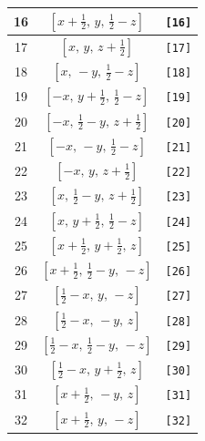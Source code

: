 \documentclass[fleqn,8pt]{jsarticle}
\begin{document}
\begin{longtable}{ccc}
16 & $\left[ x + \frac{1}{2},\, y,\, \frac{1}{2} - z \right]$ & {\tt [16]} \\ \hline
17 & $\left[ x,\, y,\, z + \frac{1}{2} \right]$ & {\tt [17]} \\ \hline
18 & $\left[ x,\, - y,\, \frac{1}{2} - z \right]$ & {\tt [18]} \\ \hline
19 & $\left[ - x,\, y + \frac{1}{2},\, \frac{1}{2} - z \right]$ & {\tt [19]} \\ \hline
20 & $\left[ - x,\, \frac{1}{2} - y,\, z + \frac{1}{2} \right]$ & {\tt [20]} \\ \hline
21 & $\left[ - x,\, - y,\, \frac{1}{2} - z \right]$ & {\tt [21]} \\ \hline
22 & $\left[ - x,\, y,\, z + \frac{1}{2} \right]$ & {\tt [22]} \\ \hline
23 & $\left[ x,\, \frac{1}{2} - y,\, z + \frac{1}{2} \right]$ & {\tt [23]} \\ \hline
24 & $\left[ x,\, y + \frac{1}{2},\, \frac{1}{2} - z \right]$ & {\tt [24]} \\ \hline
25 & $\left[ x + \frac{1}{2},\, y + \frac{1}{2},\, z \right]$ & {\tt [25]} \\ \hline
26 & $\left[ x + \frac{1}{2},\, \frac{1}{2} - y,\, - z \right]$ & {\tt [26]} \\ \hline
27 & $\left[ \frac{1}{2} - x,\, y,\, - z \right]$ & {\tt [27]} \\ \hline
28 & $\left[ \frac{1}{2} - x,\, - y,\, z \right]$ & {\tt [28]} \\ \hline
29 & $\left[ \frac{1}{2} - x,\, \frac{1}{2} - y,\, - z \right]$ & {\tt [29]} \\ \hline
30 & $\left[ \frac{1}{2} - x,\, y + \frac{1}{2},\, z \right]$ & {\tt [30]} \\ \hline
31 & $\left[ x + \frac{1}{2},\, - y,\, z \right]$ & {\tt [31]} \\ \hline
32 & $\left[ x + \frac{1}{2},\, y,\, - z \right]$ & {\tt [32]} \\
\end{longtable}
\end{document}

